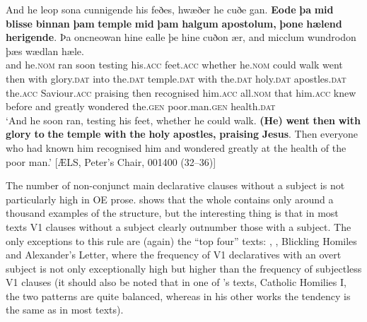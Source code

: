 \documentclass[output=paper,colorlinks,citecolor=brown]{langscibook}
\begin{document}
\ea%
\label{ex:cichosz:17}
\gll And   he     leop   sona   cunnigende   his     feðes,
hwæðer   he      cuðe   gan. \textbf{Eode}   \textbf{þa}   \textbf{mid}   \textbf{blisse}
\textbf{binnan}     \textbf{þam}     \textbf{temple}     \textbf{mid}   \textbf{þam}     \textbf{halgum} \textbf{apostolum,}   \textbf{þone}     \textbf{hælend}   \textbf{herigende}.   Þa   oncneowan hine     ealle     þe   hine     cuðon   ær,   and
micclum   wundrodon   þæs     wædlan   hæle.\\
and   he.\textsc{nom}   ran   soon  testing     his.\textsc{acc}   feet.\textsc{acc} whether   he.\textsc{nom}   could   walk   went   then   with glory.\textsc{dat}  into     the.\textsc{dat}   temple.\textsc{dat}   with   the.\textsc{dat}   holy.\textsc{dat} apostles.\textsc{dat}   the.\textsc{acc}  Saviour.\textsc{acc}   praising   then   recognised him.\textsc{acc}   all.\textsc{nom}   that   him.\textsc{acc}   knew   before   and greatly     wondered   the.\textsc{gen}   poor.man.\textsc{gen}   health.\textsc{dat}\\
\glt ‘And he soon ran, testing his feet, whether he could walk. \textbf{(He)} \textbf{went} \textbf{then} \textbf{with} \textbf{glory} \textbf{to} \textbf{the} \textbf{temple} \textbf{with} \textbf{the} \textbf{holy} \textbf{apostles,} \textbf{praising} \textbf{Jesus}. Then everyone who had known him recognised him and wondered greatly at the health of the poor man.' \hfill [ÆLS, Peter's Chair, 001400 (32--36)]
\z 

The number of non-conjunct main declarative clauses without a subject is not particularly high in OE prose.  shows that the whole  contains only around a thousand examples of the structure, but the interesting thing is that in most texts V1 clauses without a subject clearly outnumber those with a subject. The only exceptions to this rule are (again) the “top four” texts: , , Blickling Homiles and Alexander's Letter, where the frequency of V1 declaratives with an overt subject is not only exceptionally high but higher than the frequency of subjectless V1 clauses (it should also be noted that in one of 's texts, Catholic Homilies I, the two patterns are quite balanced, whereas in his other works the tendency is the same as in most  texts).
\end{document}
